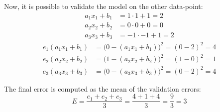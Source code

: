 {\begin{itemize}
		Now, it is possible to validate the model on the other data-point:
		\begin{align*}
		a_1x_1+b_1 & =  1 \cdot 1 + 1 = 2   \\
		a_2x_2+b_2 & =  0 \cdot 0 + 0 = 0   \\
		a_3x_3+b_3 & = -1 \cdot -1 + 1 = 2
		\end{align*}
		\begin{align*}
		e_1(a_1x_1+b_1) & = \big(0-(a_1x_1+b_1)\big)^2 = (0-2)^2 = 4\\
		e_2(a_2x_2+b_2) & = \big(1-(a_2x_2+b_2)\big)^2 = (1-0)^2 = 1\\
		e_3(a_3x_3+b_3) & = \big(0-(a_3x_3+b_3)\big)^2 = (0-2)^2 = 4
		\end{align*}
		
		The final error is computed as the mean of the validation errors: 
		\begin{equation*}
		E=\frac{e_1+e_2+e_3}{3}=\frac{4+1+4}{3}=\frac{9}{3}=3
		\end{equation*}
		
	\end{itemize}
}